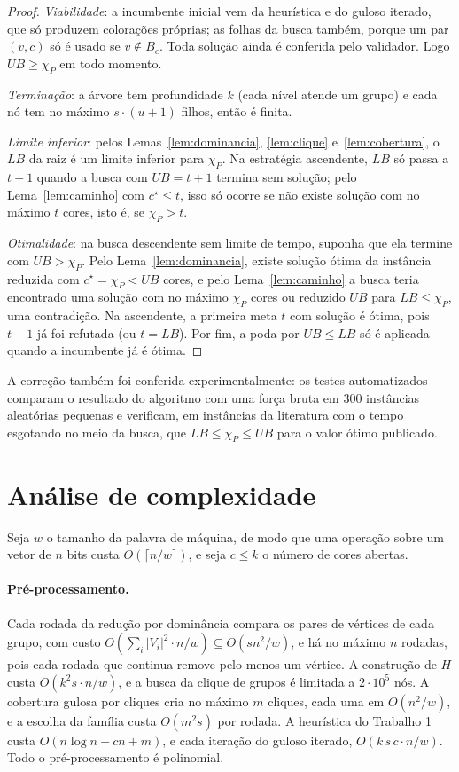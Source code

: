 \documentclass[12pt]{article}
\newcommand{\chiP}{\chi_P}
\newcommand{\LB}{\mathit{LB}}
\newcommand{\UB}{\mathit{UB}}
\begin{document}
\begin{proof}
  \emph{Viabilidade}: a incumbente inicial vem da heurística e do guloso
  iterado, que só produzem colorações próprias; as folhas da busca também,
  porque um par $(v,c)$ só é usado se $v\notin B_c$. Toda solução ainda é
  conferida pelo validador. Logo $\UB\ge\chiP$ em todo momento.

  \emph{Terminação}: a árvore tem profundidade $k$ (cada nível atende um
  grupo) e cada nó tem no máximo $s\cdot(u+1)$ filhos, então é finita.

  \emph{Limite inferior}: pelos Lemas~\ref{lem:dominancia},
  \ref{lem:clique} e~\ref{lem:cobertura}, o $\LB$ da raiz é um limite
  inferior para $\chiP$. Na estratégia ascendente, $\LB$ só passa a $t+1$
  quando a busca com $\UB=t+1$ termina sem solução; pelo
  Lema~\ref{lem:caminho} com $c^\star\le t$, isso só ocorre se não existe
  solução com no máximo $t$ cores, isto é, se $\chiP>t$.

  \emph{Otimalidade}: na busca descendente sem limite de tempo, suponha que
  ela termine com $\UB>\chiP$. Pelo Lema~\ref{lem:dominancia}, existe solução
  ótima da instância reduzida com $c^\star=\chiP<\UB$ cores, e pelo
  Lema~\ref{lem:caminho} a busca teria encontrado uma solução com no máximo
  $\chiP$ cores ou reduzido $\UB$ para $\LB\le\chiP$, uma contradição. Na
  ascendente, a primeira meta $t$ com solução é ótima, pois $t-1$ já foi
  refutada (ou $t=\LB$). Por fim, a poda por $\UB\le\LB$ só é aplicada
  quando a incumbente já é ótima.
\end{proof}

A correção também foi conferida experimentalmente: os testes automatizados
comparam o resultado do algoritmo com uma força bruta em 300 instâncias
aleatórias pequenas e verificam, em instâncias da literatura com o tempo
esgotando no meio da busca, que $\LB\le\chiP\le\UB$ para o valor ótimo
publicado.

\section{Análise de complexidade}\label{sec:analise}

Seja $w$ o tamanho da palavra de máquina, de modo que uma operação sobre um
vetor de $n$ bits custa $O(\lceil n/w\rceil)$, e seja $c\le k$ o número de
cores abertas.

\paragraph{Pré-processamento.} Cada rodada da redução por dominância compara
os pares de vértices de cada grupo, com custo
$O(\sum_i|V_i|^2\cdot n/w)\subseteq O(sn^2/w)$, e há no máximo $n$ rodadas,
pois cada rodada que continua remove pelo menos um vértice. A construção de
$H$ custa $O(k^2 s\cdot n/w)$, e a busca da clique de grupos é limitada a
$2\cdot10^5$ nós. A cobertura gulosa por cliques cria no máximo $m$ cliques,
cada uma em $O(n^2/w)$, e a escolha da família custa $O(m^2 s)$ por rodada.
A heurística do Trabalho 1 custa $O(n\log n+cn+m)$, e cada iteração do guloso
iterado, $O(k\,s\,c\cdot n/w)$. Todo o pré-processamento é polinomial.
\end{document}
